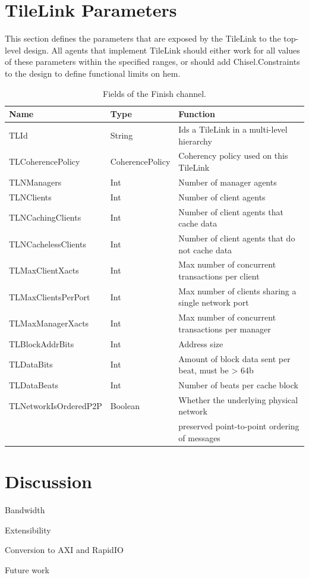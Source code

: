 \section{TileLink Parameters}

This section defines the parameters that are exposed by the TileLink to the top-level design.
All agents that implement TileLink should either work for all values of these parameters within the specified ranges, or should add Chisel.Constraints to the design to define functional limits on hem.

\begin{table}[ht]
\begin{center}
\begin{tabular}{|l|l|l|}
    \hline
Name & Type & Function \\ \hline \hline
TLId & String & Ids a TileLink in a multi-level hierarchy \\ \hline
TLCoherencePolicy & CoherencePolicy & Coherency policy used on this TileLink \\ \hline
TLNManagers & Int & Number of manager agents \\ \hline
TLNClients & Int & Number of client agents \\ \hline
TLNCachingClients & Int & Number of client agents that cache data \\ \hline
TLNCachelessClients & Int & Number of client agents that do not cache data \\ \hline
TLMaxClientXacts & Int & Max number of concurrent transactions per client \\ \hline
TLMaxClientsPerPort & Int & Max number of clients sharing a single network port \\ \hline
TLMaxManagerXacts & Int & Max number of concurrent transactions per manager \\ \hline
TLBlockAddrBits & Int & Address size \\ \hline
TLDataBits & Int & Amount of block data sent per beat, must be > 64b \\ \hline
TLDataBeats & Int & Number of beats per cache block \\ \hline
TLNetworkIsOrderedP2P & Boolean & Whether the underlying physical network \\
                      &         & preserved point-to-point ordering of messages \\ \hline
\end{tabular}
\end{center}
\caption{Fields of the Finish channel.}
\label{tab:finish}
\end{table}

\section{Discussion}

Bandwidth

Extensibility

Conversion to AXI and RapidIO

Future work
